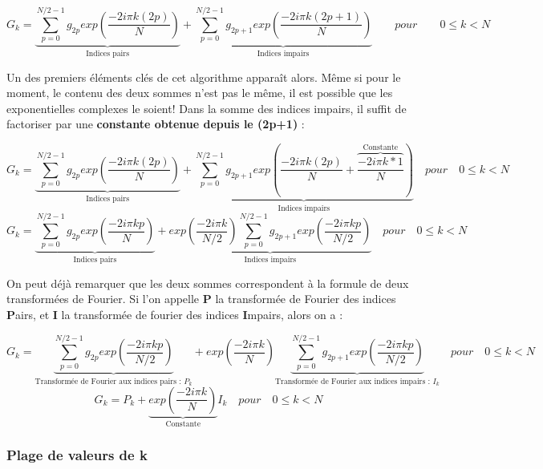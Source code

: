 \documentclass{article}
\begin{document}
\begin{equation}
	G_{k} = \underbrace{\sum_{p = 0}^{N/2-1}g_{2p} exp(\frac{-2i\pi k(2p)}{N})}_\text{Indices pairs} + \underbrace{\sum_{p = 0}^{N/2-1}g_{2p+1} exp(\frac{-2i\pi k(2p+1)}{N})}_\text{Indices impairs} \qquad pour \qquad 0 \leq k < N
\end{equation}

\newpage Un des premiers éléments clés de cet algorithme apparaît alors. Même si pour le moment, le contenu des deux sommes n'est pas le même, il est possible que les exponentielles complexes le soient! Dans la somme des indices impairs, il suffit de factoriser par une \textbf{constante obtenue depuis le (2p+1)} :

\begin{equation}
	G_{k} = \underbrace{\sum_{p = 0}^{N/2-1}g_{2p} exp(\frac{-2i\pi k(2p)}{N})}_\text{Indices pairs} + \underbrace{  \sum_{p = 0}^{N/2-1}g_{2p+1} exp(\frac{-2i\pi k(2p)}{N} + \overbrace{\frac{-2i\pi k*1}{N}}^\text{Constante} )  }_\text{Indices impairs} \quad pour \quad 0 \leq k < N
\end{equation}
\begin{equation}
	G_{k} = \underbrace{\sum_{p = 0}^{N/2-1}g_{2p} exp(\frac{-2i\pi kp}{N})}_\text{Indices pairs} + \underbrace{exp(\frac{-2i\pi k}{N/2})\sum_{p = 0}^{N/2-1}g_{2p+1} exp(\frac{-2i\pi k	p}{N/2})}_\text{Indices impairs} \quad pour \quad 0 \leq k < N
\end{equation}

On peut déjà remarquer que les deux sommes correspondent à la formule de deux transformées de Fourier. Si l'on appelle \textbf{P} la transformée de Fourier des indices \textbf{P}airs, et \textbf{I} la transformée de fourier des indices \textbf{I}mpairs, alors on a :

\begin{equation}
	G_{k} = \underbrace{\sum_{p = 0}^{N/2-1}g_{2p} exp(\frac{-2i\pi kp}{N/2})}_\text{Transformée de Fourier aux indices pairs : $P_{k}$} + exp(\frac{-2i\pi k}{N})\underbrace{\sum_{p = 0}^{N/2-1}g_{2p+1} exp(\frac{-2i\pi k	p}{N/2})}_\text{Transformée de Fourier aux indices impairs : $I_{k}$} \quad pour \quad 0 \leq k < N
\end{equation}
\begin{equation}
	G_{k} = P_{k} + \underbrace{exp(\frac{-2i\pi k}{N})}_\text{Constante} I_{k} \quad pour \quad 0 \leq k < N
\end{equation}

\subsubsection{Plage de valeurs de k}
\end{document}
